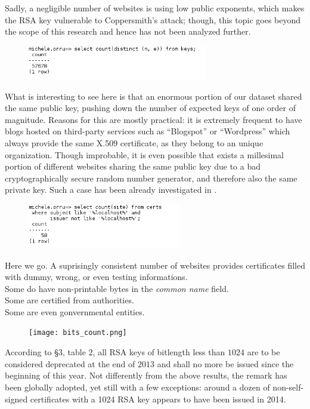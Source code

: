 Sadly, a negligible number of websites is using low public exponents,
which makes the RSA key vulnerable to Coppersmith's attack; though, this
topic goes beyond the scope of this research and hence has not been analyzed
further.

\begin{figure}[H]
  \includegraphics[width=0.7\textwidth]{n_count.png}
\end{figure}

What is interesting to see here is that an enormous portion of our dataset
shared the same public key, pushing down the number of expected keys of one
order of magnitude. Reasons for this are mostly practical: it is extremely
frequent to have blogs hosted on third-party services such as ``Blogspot'' or
``Wordpress'' which always provide the same X.509 certificate, as they belong to
an unique organization.
Though improbable, it is even possible that exists a millesimal portion of
different websites sharing the same public key due to a
bad cryptographically secure random number generator, and therefore also the
same private key. Such a case has been already investigated in \cite{ron:whit}.

\begin{figure}[H]
  \includegraphics[width=0.6\textwidth]{localhost_certs.png}
\end{figure}

Here we go. A suprisingly consistent number of websites provides certificates
filled with dummy, wrong, or even testing informations.\\
Some do have non-printable bytes in the \emph{common name} field.\\
Some are certified from authorities. \\
Some are even gonvernmental entities.

\begin{figure}[H]
  \texttt{[image: bits\_count.png]}
\end{figure}

According to \cite{nist:keylen_transitions} \S 3, table $2$, all RSA keys of
bitlength less than $1024$ are to be considered deprecated at the end of $2013$
and shall no more be issued since the beginning of this year. Not differently
from the above results, the remark has been globally adopted, yet still with a
few exceptions: around a dozen of non-self-signed certificates with a 1024 RSA
key appears to have been issued in 2014.



